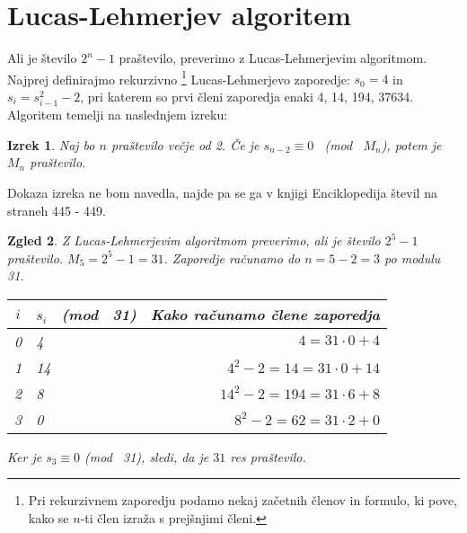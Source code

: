 \documentclass[12pt]{article}
\newtheorem{Izrek}{{\sc Izrek}}[section]
\newtheorem{Zgled}[Izrek]{{\sc Zgled}}
\newenvironment{izrek}{\begin{Izrek}\sl}{\end{Izrek}}
\newenvironment{zgled}{\begin{Zgled}\sl }{\end{Zgled}}
\begin{document}
\section{Lucas-Lehmerjev algoritem}
Ali je število $2^n-1$ praštevilo, preverimo z Lucas-Lehmerjevim algoritmom.
\newline
Najprej definirajmo rekurzivno \footnote{Pri rekurzivnem zaporedju podamo nekaj začetnih členov in formulo, ki pove, kako se $n$-ti člen izraža s prejšnjimi členi.} Lucas-Lehmerjevo zaporedje: $s_0=4$ in 
\newline
$s_i=s^2_{i-1}-2$, pri katerem so prvi členi zaporedja enaki 4, 14, 194, 37634.
\newline
Algoritem temelji na naslednjem izreku:
\begin{izrek}
Naj bo $n$ praštevilo večje od 2. Če je $s_{n-2}\equiv0$ \ (mod \ $M_n$), potem je $M_n$ praštevilo.
\end{izrek}
Dokaza izreka ne bom navedla, najde pa se ga v knjigi Enciklopedija števil na straneh 445 - 449.
\begin{zgled}
Z Lucas-Lehmerjevim algoritmom preverimo, ali je število $2^5-1$ praštevilo.
\newline
$M_5=2^5-1=31$. Zaporedje računamo do $n=5-2=3$ po modulu 31.
\newline
\newline
\begin{tabular}{||c|l|r||}
\hline
$i$ & $s_i$ \ (mod \ 31) & Kako računamo člene zaporedja \\
\hline
0 & 4 & $4=31\cdot 0+4$  \\
\hline
1 & 14 & $4^2-2=14=31\cdot 0+14$ \\
\hline
2 & 8 & $14^2-2=194=31\cdot 6+8$ \\
\hline
3 & 0 & $8^2-2=62=31\cdot 2+0$ \\
\hline
\end{tabular}
\newline
\newline
Ker je $s_3\equiv0$ (mod \ 31), sledi, da je $31$ res praštevilo.
\end{zgled}
\end{document}
